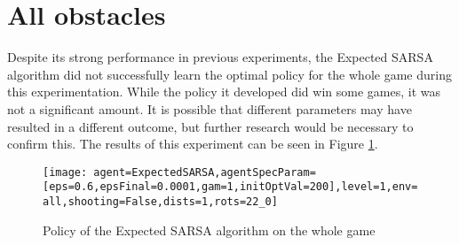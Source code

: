 \section{All obstacles}
Despite its strong performance in previous experiments, the Expected SARSA algorithm did not successfully learn the optimal policy for the whole game during this experimentation. While the policy it developed did win some games, it was not a significant amount. It is possible that different parameters may have resulted in a different outcome, but further research would be necessary to confirm this. The results of this experiment can be seen in Figure \ref{fig:all}.

\begin{figure}[h]
    \centering
    \texttt{[image: agent=ExpectedSARSA,agentSpecParam=[eps=0.6,epsFinal=0.0001,gam=1,initOptVal=200],level=1,env=all,shooting=False,dists=1,rots=22\_0]}
	\caption{Policy of the Expected SARSA algorithm on the whole game}    
    \label{fig:all}
\end{figure}

